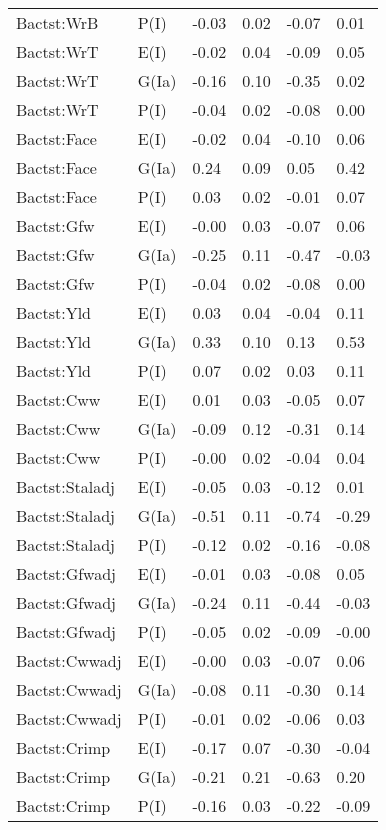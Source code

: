 \begin{center}
\begin{longtable}{|p{1.1in}|p{0.7in}|p{0.7in}|p{0.6in}|p{0.6in}|p{0.6in}|}
  Bactst:WrB & P(I) & -0.03 & 0.02 & -0.07 & 0.01 \\ 
  Bactst:WrT & E(I) & -0.02 & 0.04 & -0.09 & 0.05 \\ 
  Bactst:WrT & G(Ia) & -0.16 & 0.10 & -0.35 & 0.02 \\ 
  Bactst:WrT & P(I) & -0.04 & 0.02 & -0.08 & 0.00 \\ 
  Bactst:Face & E(I) & -0.02 & 0.04 & -0.10 & 0.06 \\ 
  Bactst:Face & G(Ia) & 0.24 & 0.09 & 0.05 & 0.42 \\ 
  Bactst:Face & P(I) & 0.03 & 0.02 & -0.01 & 0.07 \\ 
  Bactst:Gfw & E(I) & -0.00 & 0.03 & -0.07 & 0.06 \\ 
  Bactst:Gfw & G(Ia) & -0.25 & 0.11 & -0.47 & -0.03 \\ 
  Bactst:Gfw & P(I) & -0.04 & 0.02 & -0.08 & 0.00 \\ 
  Bactst:Yld & E(I) & 0.03 & 0.04 & -0.04 & 0.11 \\ 
  Bactst:Yld & G(Ia) & 0.33 & 0.10 & 0.13 & 0.53 \\ 
  Bactst:Yld & P(I) & 0.07 & 0.02 & 0.03 & 0.11 \\ 
  Bactst:Cww & E(I) & 0.01 & 0.03 & -0.05 & 0.07 \\ 
  Bactst:Cww & G(Ia) & -0.09 & 0.12 & -0.31 & 0.14 \\ 
  Bactst:Cww & P(I) & -0.00 & 0.02 & -0.04 & 0.04 \\ 
  Bactst:Staladj & E(I) & -0.05 & 0.03 & -0.12 & 0.01 \\ 
  Bactst:Staladj & G(Ia) & -0.51 & 0.11 & -0.74 & -0.29 \\ 
  Bactst:Staladj & P(I) & -0.12 & 0.02 & -0.16 & -0.08 \\ 
  Bactst:Gfwadj & E(I) & -0.01 & 0.03 & -0.08 & 0.05 \\ 
  Bactst:Gfwadj & G(Ia) & -0.24 & 0.11 & -0.44 & -0.03 \\ 
  Bactst:Gfwadj & P(I) & -0.05 & 0.02 & -0.09 & -0.00 \\ 
  Bactst:Cwwadj & E(I) & -0.00 & 0.03 & -0.07 & 0.06 \\ 
  Bactst:Cwwadj & G(Ia) & -0.08 & 0.11 & -0.30 & 0.14 \\ 
  Bactst:Cwwadj & P(I) & -0.01 & 0.02 & -0.06 & 0.03 \\ 
  Bactst:Crimp & E(I) & -0.17 & 0.07 & -0.30 & -0.04 \\ 
  Bactst:Crimp & G(Ia) & -0.21 & 0.21 & -0.63 & 0.20 \\ 
  Bactst:Crimp & P(I) & -0.16 & 0.03 & -0.22 & -0.09 \\ 

\end{longtable}
\end{center}
